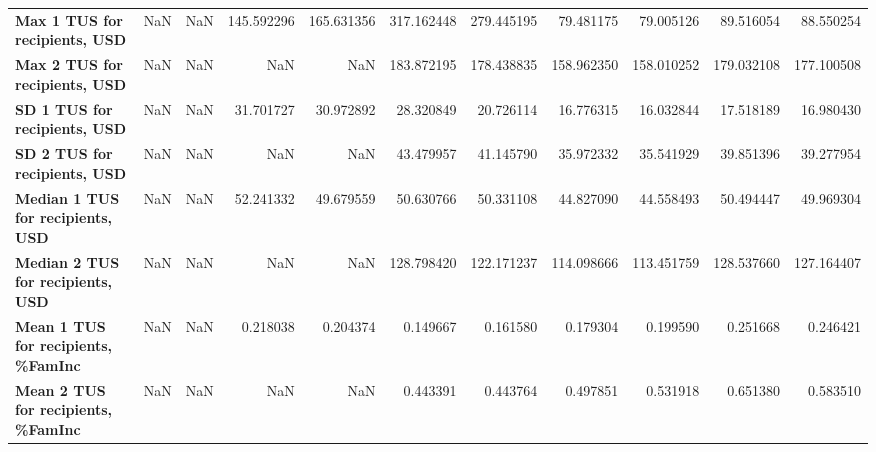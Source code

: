 \begin{longtable}{lrrrrrrrrrr}
\textbf{Max 1 TUS for recipients, USD     } &   NaN &   NaN &   145.592296 &    165.631356 &    317.162448 &    279.445195 &     79.481175 &     79.005126 &    89.516054 &    88.550254 \\
\textbf{Max 2 TUS for recipients, USD     } &   NaN &   NaN &          NaN &           NaN &    183.872195 &    178.438835 &    158.962350 &    158.010252 &   179.032108 &   177.100508 \\
\textbf{SD 1 TUS for recipients, USD      } &   NaN &   NaN &    31.701727 &     30.972892 &     28.320849 &     20.726114 &     16.776315 &     16.032844 &    17.518189 &    16.980430 \\
\textbf{SD 2 TUS for recipients, USD      } &   NaN &   NaN &          NaN &           NaN &     43.479957 &     41.145790 &     35.972332 &     35.541929 &    39.851396 &    39.277954 \\
\textbf{Median 1 TUS for recipients, USD  } &   NaN &   NaN &    52.241332 &     49.679559 &     50.630766 &     50.331108 &     44.827090 &     44.558493 &    50.494447 &    49.969304 \\
\textbf{Median 2 TUS for recipients, USD  } &   NaN &   NaN &          NaN &           NaN &    128.798420 &    122.171237 &    114.098666 &    113.451759 &   128.537660 &   127.164407 \\
\textbf{Mean 1 TUS for recipients, \%FamInc} &   NaN &   NaN &     0.218038 &      0.204374 &      0.149667 &      0.161580 &      0.179304 &      0.199590 &     0.251668 &     0.246421 \\
\textbf{Mean 2 TUS for recipients, \%FamInc} &   NaN &   NaN &          NaN &           NaN &      0.443391 &      0.443764 &      0.497851 &      0.531918 &     0.651380 &     0.583510 \\
\end{longtable}

